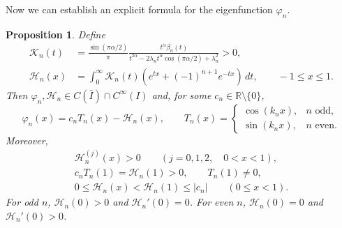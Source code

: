 \documentclass[11pt]{amsart}
\numberwithin{equation}{section}
\newtheorem{proposition}[proposition]{Proposition}
\theoremstyle{remark}
\newcommand{\R}{\mathbb R}
\begin{document}
Now we can establish an explicit formula for the eigenfunction $\varphi_n$.
\begin{proposition}\label{prop:nodal-representation}
Define
\begin{align}
 \mathcal K_n(t)&=\frac{\sin(\pi\alpha/2)}\pi
 \frac{t^\alpha\beta_n(t)}
      {t^{2\alpha}-2\lambda_nt^\alpha\cos(\pi\alpha/2)+\lambda_n^2}>0,
 \label{eq:nodal-K}\\
 \mathcal H_n(x)&=\int_0^\infty\mathcal K_n(t)
       (e^{tx}+(-1)^{n+1}e^{-tx})\,dt,\qquad -1\le x\le1.
 \label{eq:nodal-h}
\end{align}
Then $\varphi_n,\mathcal H_n\in C(\bar{I})\cap C^\infty(I)$ and, for some
$c_n\in\R\setminus\{0\}$,
\begin{equation}\label{eq:nodal-exact-representation}
 \varphi_n(x)=c_nT_n(x)-\mathcal H_n(x),\qquad
 T_n(x)=\begin{cases}
       \cos(k_nx),&n\text{ odd},\\
       \sin(k_nx),&n\text{ even}.
       \end{cases}
\end{equation}
Moreover,
\begin{gather}
 \mathcal H_n^{(j)}(x)>0\qquad(j=0,1,2,\quad0<x<1),
 \label{eq:nodal-h-signs}\\
 c_nT_n(1)=\mathcal H_n(1)>0,\qquad T_n(1)\ne0,
 \label{eq:nodal-nonresonance}\\
 0\le\mathcal H_n(x)<\mathcal H_n(1)\le|c_n|
       \qquad(0\le x<1).
 \label{eq:nodal-amplitude}
\end{gather}
For odd $n$, $\mathcal H_n(0)>0$ and $\mathcal H_n'(0)=0$.
For even $n$, $\mathcal H_n(0)=0$ and $\mathcal H_n'(0)>0$.
\end{proposition}
\end{document}
